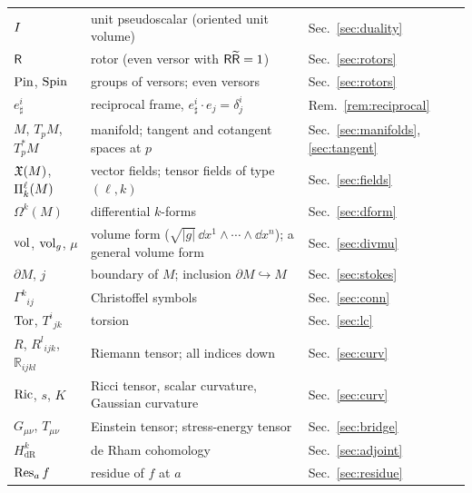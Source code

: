 \begin{tabular}{@{}>{\raggedright\arraybackslash}p{3.2cm}>{\raggedright\arraybackslash}p{8.8cm}>{\raggedright\arraybackslash}p{2.4cm}@{}}
$I$ & unit pseudoscalar (oriented unit volume) & Sec.~\ref{sec:duality}\\
$\mathsf{R}$ & rotor (even versor with $\mathsf{R}\widetilde{\mathsf{R}}=1$) & Sec.~\ref{sec:rotors}\\
$\mathrm{Pin}$, $\mathrm{Spin}$ & groups of versors; even versors & Sec.~\ref{sec:rotors}\\
$e^i_\sharp$ & reciprocal frame, $e^i_\sharp\cdot e_j=\delta^i_j$ & Rem.~\ref{rem:reciprocal}\\
$M$, $T_pM$, $T^*_pM$ & manifold; tangent and cotangent spaces at $p$ & Sec.~\ref{sec:manifolds}, \ref{sec:tangent}\\
$\mathfrak{X}(M)$, $\Pi^{\ell}_{k}(M)$ & vector fields; tensor fields of type $(\ell,k)$ & Sec.~\ref{sec:fields}\\
$\Omega^k(M)$ & differential $k$-forms & Sec.~\ref{sec:dform}\\
$\mathrm{vol}$, $\mathrm{vol}_g$, $\mu$ & volume form ($\sqrt{|g|}\,\dd x^1\wedge\cdots\wedge\dd x^n$); a general volume form & Sec.~\ref{sec:divmu}\\
$\partial M$, $j$ & boundary of $M$; inclusion $\partial M\hookrightarrow M$ & Sec.~\ref{sec:stokes}\\
$\Gamma^k{}_{ij}$ & Christoffel symbols & Sec.~\ref{sec:conn}\\
$\operatorname{Tor}$, $T^i{}_{jk}$ & torsion & Sec.~\ref{sec:lc}\\
$R$, $R^l{}_{ijk}$, $\mathbb R_{ijkl}$ & Riemann tensor; all indices down & Sec.~\ref{sec:curv}\\
$\operatorname{Ric}$, $s$, $K$ & Ricci tensor, scalar curvature, Gaussian curvature & Sec.~\ref{sec:curv}\\
$G_{\mu\nu}$, $T_{\mu\nu}$ & Einstein tensor; stress-energy tensor & Sec.~\ref{sec:bridge}\\
$H^k_{\mathrm{dR}}$ & de Rham cohomology & Sec.~\ref{sec:adjoint}\\
$\operatorname{Res}_af$ & residue of $f$ at $a$ & Sec.~\ref{sec:residue}\\
\bottomrule
\end{tabular}
